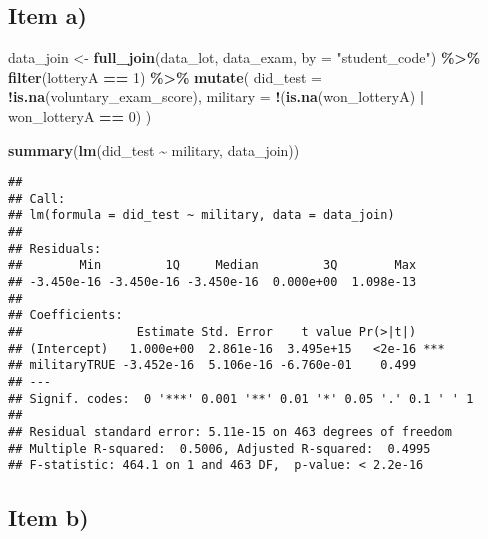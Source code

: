 \documentclass[
]{article}
\newenvironment{Shaded}{\begin{snugshade}}{\end{snugshade}}
\newcommand{\AttributeTok}[1]{\textcolor[rgb]{0.13,0.29,0.53}{#1}}
\newcommand{\DecValTok}[1]{\textcolor[rgb]{0.00,0.00,0.81}{#1}}
\newcommand{\FunctionTok}[1]{\textcolor[rgb]{0.13,0.29,0.53}{\textbf{#1}}}
\newcommand{\NormalTok}[1]{#1}
\newcommand{\OtherTok}[1]{\textcolor[rgb]{0.56,0.35,0.01}{#1}}
\newcommand{\SpecialCharTok}[1]{\textcolor[rgb]{0.81,0.36,0.00}{\textbf{#1}}}
\newcommand{\StringTok}[1]{\textcolor[rgb]{0.31,0.60,0.02}{#1}}
\begin{document}
\subsection{Item a)}\label{item-a-2}

\begin{Shaded}
\begin{Highlighting}[]
\NormalTok{data\_join }\OtherTok{\textless{}{-}} \FunctionTok{full\_join}\NormalTok{(data\_lot, data\_exam, }\AttributeTok{by =} \StringTok{"student\_code"}\NormalTok{) }\SpecialCharTok{\%\textgreater{}\%}
  \FunctionTok{filter}\NormalTok{(lotteryA }\SpecialCharTok{==} \DecValTok{1}\NormalTok{) }\SpecialCharTok{\%\textgreater{}\%}
  \FunctionTok{mutate}\NormalTok{(}
    \AttributeTok{did\_test =} \SpecialCharTok{!}\FunctionTok{is.na}\NormalTok{(voluntary\_exam\_score),}
    \AttributeTok{military =} \SpecialCharTok{!}\NormalTok{(}\FunctionTok{is.na}\NormalTok{(won\_lotteryA) }\SpecialCharTok{|}\NormalTok{ won\_lotteryA }\SpecialCharTok{==} \DecValTok{0}\NormalTok{)}
\NormalTok{  ) }

\FunctionTok{summary}\NormalTok{(}\FunctionTok{lm}\NormalTok{(did\_test }\SpecialCharTok{\textasciitilde{}}\NormalTok{ military, data\_join))}
\end{Highlighting}
\end{Shaded}

\begin{verbatim}
## 
## Call:
## lm(formula = did_test ~ military, data = data_join)
## 
## Residuals:
##        Min         1Q     Median         3Q        Max 
## -3.450e-16 -3.450e-16 -3.450e-16  0.000e+00  1.098e-13 
## 
## Coefficients:
##                Estimate Std. Error    t value Pr(>|t|)    
## (Intercept)   1.000e+00  2.861e-16  3.495e+15   <2e-16 ***
## militaryTRUE -3.452e-16  5.106e-16 -6.760e-01    0.499    
## ---
## Signif. codes:  0 '***' 0.001 '**' 0.01 '*' 0.05 '.' 0.1 ' ' 1
## 
## Residual standard error: 5.11e-15 on 463 degrees of freedom
## Multiple R-squared:  0.5006, Adjusted R-squared:  0.4995 
## F-statistic: 464.1 on 1 and 463 DF,  p-value: < 2.2e-16
\end{verbatim}

\subsection{Item b)}\label{item-b-2}
\end{document}
